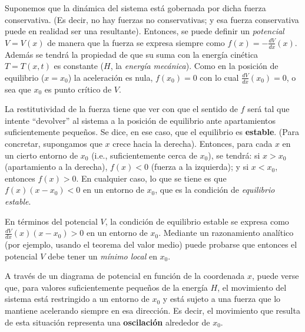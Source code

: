 \documentclass[a4paper,spanish]{article}
\numberwithin{equation}{section}
\begin{document}
Suponemos que la din\'amica del sistema est\'a gobernada por dicha fuerza conservativa. (Es decir, no hay fuerzas no conservativas; y esa fuerza conservativa puede en realidad ser una resultante). Entonces, se puede definir un \textit{potencial} $V=V(x)$ de manera que la fuerza se expresa siempre como $f(x)=-\frac{dV}{dx}(x)$. Adem\'as se tendr\'a la propiedad de que su suma con la energ\'ia cin\'etica $T=T(x,t)$ es constante ($H$, la \textit{energ\'ia mec\'anica}). Como en la posici\'on de equilibrio ($x=x_0$) la aceleraci\'on es nula, $f(x_0)=0$ con lo cual $\frac{dV}{dx}(x_0)=0$, o sea que $x_0$ es punto cr\'itico de $V$.

La restitutividad de la fuerza tiene que ver con que el sentido de $f$ ser\'a tal que intente ``devolver'' al sistema a la posici\'on de equilibrio ante apartamientos suficientemente peque\~nos. Se dice, en ese caso, que el equilibrio es \textbf{estable}. (Para concretar, supongamos que $x$ crece hacia la derecha). Entonces, para cada $x$ en un cierto entorno de $x_0$ (i.e., suficientemente cerca de $x_0$), se tendr\'a: si $x>x_0$ (apartamiento a la derecha), $f(x)<0$ (fuerza a la izquierda); y si $x<x_0$, entonces $f(x)>0$. En cualquier caso, lo que se tiene es que $f(x)(x-x_0)<0$ en un entorno de $x_0$, que es la condici\'on de \textit{equilibrio estable}.

En t\'erminos del potencial $V$, la condici\'on de equilibrio estable se expresa como $\frac{dV}{dx}(x)(x-x_0)>0$ en un entorno de $x_0$. Mediante un razonamiento anal\'itico (por ejemplo, usando el teorema del valor medio) puede probarse que entonces el potencial $V$ debe tener un \textit{m\'inimo local} en $x_0$.

A trav\'es de un diagrama de potencial en funci\'on de la coordenada $x$, puede verse que, para valores suficientemente peque\~nos de la energ\'ia $H$, el movimiento del sistema est\'a restringido a un entorno de $x_0$ y est\'a sujeto a una fuerza que lo mantiene acelerando siempre en esa direcci\'on. Es decir, el movimiento que resulta de esta situaci\'on representa una \textbf{oscilaci\'on} alrededor de $x_0$.
\end{document}
